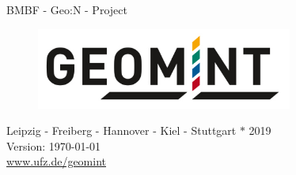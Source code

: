 
\begin{center}

\quad
\vspace{2cm}
\quad

\Huge
BMBF - Geo:N - Project
\\[3cm]
\begin{figure}[htbp]
\centering
\includegraphics[width=0.75\textwidth]{figures/geomint-logo}
\end{figure}

\vfill
\Large
Leipzig - Freiberg - Hannover - Kiel - Stuttgart $\ast$ 2019
\\[1ex]
Version: \today
\\[1ex]
\url{www.ufz.de/geomint}
\end{center}
\normalsize
